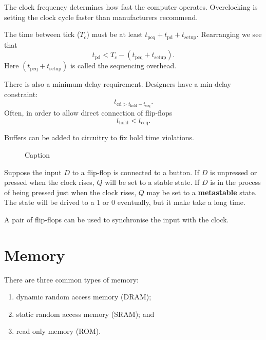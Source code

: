 \begin{definition}
    The clock frequency determines how fast the computer operates. Overclocking is setting the clock cycle faster than manufacturers recommend.
\end{definition}

\begin{remark}
    The time between tick ($T_c$) must be at least $t_{\text{pcq}}+t_{\text{pd}}+t_{\text{setup}}$. Rearranging we see that \[t_{\text{pd}}<T_c-(t_{\text{pcq}}+t_{\text{setup}}).\] Here $(t_{\text{pcq}}+t_{\text{setup}})$ is called the sequencing overhead.
\end{remark}

There is also a minimum delay requirement. Designers have a min-delay constraint: \[t_{\text{cd}>t_{\text{hold}}-t_{\text{ccq}}}.\] Often, in order to allow direct connection of flip-flops \[t_{\text{hold}}<t_{\text{ccq}}.\]

Buffers can be added to circuitry to fix hold time violations.

\begin{figure}
    \centering
    \begin{circuitikz}
    
    \end{circuitikz}
    \caption{Caption}
    \label{fig:my_label}
\end{figure}

Suppose the input $D$ to a flip-flop is connected to a button. If $D$ is unpressed or pressed when the clock rises, $Q$ will be set to a stable state. If $D$ is in the process of being pressed just when the clock rises, $Q$ may be set to a \textbf{metastable} state. The state will be drived to a 1 or 0 eventually, but it make take a long time.

A pair of flip-flops can be used to synchronise the input with the clock. %



\section{Memory}

\begin{definition}
    There are three common types of memory:
    \begin{enumerate}
        \item dynamic random access memory (DRAM);
        \item static random access memory (SRAM); and
        \item read only memory (ROM).
    \end{enumerate}
\end{definition}

